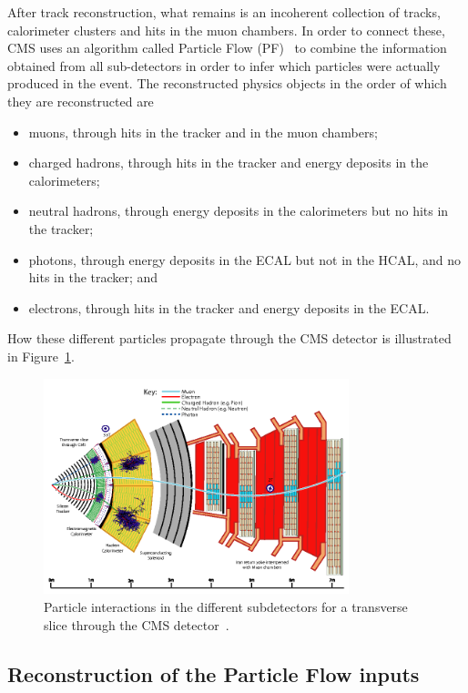 After track reconstruction, what remains is an incoherent collection of tracks, calorimeter clusters and hits in the muon chambers. In order to connect these, CMS uses an algorithm called Particle Flow (PF)~\cite{1748-0221-12-10-P10003} to combine the information obtained from all sub-detectors in order to infer which particles were actually produced in the event.
The reconstructed physics objects in the order of which they are reconstructed are
\begin{itemize}
  \itemsep0em 
  \item muons, through hits in the tracker and in the muon chambers;
  \item charged hadrons, through hits in the tracker and energy deposits in the calorimeters;
  \item neutral hadrons, through energy deposits in the calorimeters but no hits in the tracker;
  \item photons, through energy deposits in the ECAL but not in the HCAL, and no hits in the tracker; and
  \item electrons, through hits in the tracker and energy deposits in the ECAL.
\end{itemize}
How these different particles propagate through the CMS detector is illustrated in Figure~\ref{fig:objreco:PF}.
\begin{figure}[h!] 
    \centering
    \includegraphics[width=0.79\textwidth]{figures/event_reconstruction/PF.png}
    \caption{Particle interactions in the different subdetectors for a transverse slice through the CMS detector~\cite{1748-0221-12-10-P10003}.}
    \label{fig:objreco:PF}
\end{figure} 

\subsection{Reconstruction of the Particle Flow inputs}

